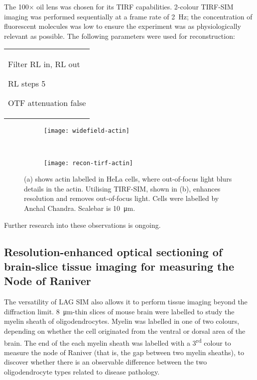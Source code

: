 The 100$\times$ oil lens was chosen for its TIRF capabilities. 
2-colour TIRF-SIM imaging was performed sequentially at a frame rate of \SI{2}{\hertz}; the concentration of fluorescent molecules was low to ensure the experiment was as physiologically relevant as possible. 
The following parameters were used for reconstruction: \newline
\begin{tabular}{p{}}
\begin{labelling}[margin=OTF attenuation]
	\item[Filter] RL in, RL out
	\item[RL steps] 5
	\item[OTF attenuation] false
\end{labelling}
\end{tabular}


\begin{figure}[tbp!]
\centering
\begin{subfigure}[b]{0.7\textwidth}
	\texttt{[image: widefield-actin]}
	\caption{}\label{fig:widefield-actin}
\end{subfigure}

~\newline
\begin{subfigure}[b]{0.7\textwidth}
	\texttt{[image: recon-tirf-actin]}
	\caption{}\label{fig:recon-tirf-actin}
\end{subfigure}
\caption[LAG SIM: TIRF imaging of actin in HeLa cells removes out-of-focus light]{(a) shows actin labelled in HeLa cells, where out-of-focus light blurs details in the actin. Utilising TIRF-SIM, shown in (b), enhances resolution and removes out-of-focus light. Cells were labelled by Anchal Chandra. Scalebar is \SI{10}{\micro\metre}. }
\label{fig:recon-actin}
\end{figure}

Further research into these observations is ongoing. 


\subsection{Resolution-enhanced optical sectioning of brain-slice tissue imaging for measuring the Node of Raniver}
The versatility of LAG SIM also allows it to perform tissue imaging beyond the diffraction limit. 
\SI{8}{\micro\metre}-thin slices of mouse brain were labelled to study the myelin sheath of oligodendrocytes. 
Myelin was labelled in one of two colours, depending on whether the cell originated from the ventral or dorsal area of the brain. 
The end of the each myelin sheath was labelled with a 3\textsuperscript{rd} colour to measure the node of Raniver (that is, the gap between two myelin sheaths), to discover whether there is an observable difference between the two oligodendrocyte types related to disease pathology. 

